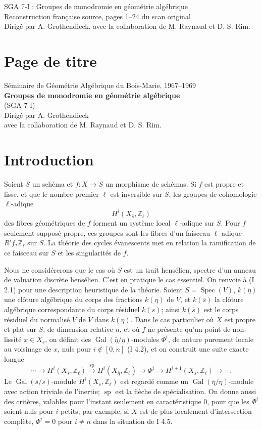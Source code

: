 \documentclass[11pt]{article}
\providecommand{\Spec}{\operatorname{Spec}}
\providecommand{\Gal}{\operatorname{Gal}}
\providecommand{\Zl}{\mathbb Z_\ell}
\begin{document}
\begin{center}
{\Large SGA 7-I : Groupes de monodromie en géométrie algébrique}\\[0.4em]
{\large Reconstruction française source, pages 1--24 du scan original}\\[0.4em]
Dirigé par A. Grothendieck, avec la collaboration de M. Raynaud et D. S. Rim.
\end{center}

\section*{Page de titre}
\begin{center}
Séminaire de Géométrie Algébrique du Bois-Marie, 1967--1969\\[0.3em]
\textbf{Groupes de monodromie en géométrie algébrique}\\
(SGA 7 I)\\[0.8em]
Dirigé par A. Grothendieck\\
avec la collaboration de M. Raynaud et D. S. Rim.
\end{center}

\section*{Introduction}
Soient $S$ un schéma et $f:X\to S$ un morphisme de schémas. Si $f$ est propre et lisse, et que le nombre premier $\ell$ est inversible sur $S$, les groupes de cohomologie $\ell$-adique
\[
H^i(X_{\bar s},\Zl)
\]
des fibres géométriques de $f$ forment un système local $\ell$-adique sur $S$. Pour $f$ seulement supposé propre, ces groupes sont les fibres d'un faisceau $\ell$-adique $R^if_*\Zl$ sur $S$. La théorie des cycles évanescents met en relation la ramification de ce faisceau sur $S$ et les singularités de $f$.

Nous ne considérerons que le cas où $S$ est un trait hensélien, spectre d'un anneau de valuation discrète hensélien. C'est en pratique le cas essentiel. On renvoie à (I 2.1) pour une description heuristique de la théorie. Soient $S=\Spec(V)$, $k(\bar\eta)$ une clôture algébrique du corps des fractions $k(\eta)$ de $V$, et $k(\bar s)$ la clôture algébrique correspondante du corps résiduel $k(s)$; ainsi $k(\bar s)$ est le corps résiduel du normalisé $\bar V$ de $V$ dans $k(\bar\eta)$. Dans le cas particulier où $X$ est propre et plat sur $S$, de dimension relative $n$, et où $f$ ne présente qu'un point de non-lissité $x\in X_s$, on définit des $\Gal(\bar\eta/\eta)$-modules $\Phi^i$, de nature purement locale au voisinage de $x$, nuls pour $i\notin[0,n]$ (I 4.2), et on construit une suite exacte longue
\[
\cdots\to H^i(X_s,\Zl)\xrightarrow{\operatorname{sp}}H^i(X_{\bar\eta},\Zl)\to\Phi^i\to H^{i+1}(X_s,\Zl)\to\cdots.
\]
Le $\Gal(\bar s/s)$-module $H^i(X_s,\Zl)$ est regardé comme un $\Gal(\bar\eta/\eta)$-module avec action triviale de l'inertie; $\operatorname{sp}$ est la flèche de spécialisation. On donne aussi des critères, valables pour l'instant seulement en caractéristique $0$, pour que les $\Phi^i$ soient nuls pour $i$ petits; par exemple, si $X$ est de plus localement d'intersection complète, $\Phi^i=0$ pour $i\ne n$ dans la situation de I 4.5.
\end{document}
